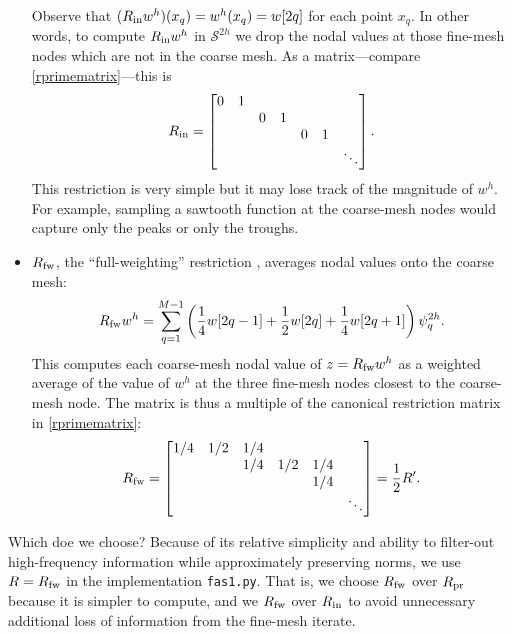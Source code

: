 \documentclass[letterpaper,final,12pt,reqno]{amsart}
\begin{document}
\begin{itemize}
Observe that $(R_{\text{in}} w^h)(x_q) = w^h(x_q) = w[2q]$ for each point $x_q$.  In other words, to compute $R_{\text{in}} w^h$ in $\mathcal{S}^{2h}$ we drop the nodal values at those fine-mesh nodes which are not in the coarse mesh.  As a matrix---compare \eqref{rprimematrix}---this is
\begin{equation}
R_{\text{in}} = \begin{bmatrix}
0 & 1 &   &   &   &   &\\
  &   & 0 & 1 &   &   & \\
  &   &   &   & 0 & 1 & \\
  &   &   &   &   &   & \ddots
\end{bmatrix}. \label{rinmatrix}
\end{equation}
This restriction is very simple but it may lose track of the magnitude of $w^h$.  For example, sampling a sawtooth function at the coarse-mesh nodes would capture only the peaks or only the troughs.
\item $R_{\text{fw}}$, the ``full-weighting'' restriction \cite{Briggsetal2000}, averages nodal values onto the coarse mesh:
\begin{equation}
  R_{\text{fw}} w^h = \sum_{q=1}^{M-1} \left(\frac{1}{4} w[2q-1] + \frac{1}{2} w[2q] + \frac{1}{4} w[2q+1]\right) \psi_q^{2h}. \label{rfwdefinition}
\end{equation}
This computes each coarse-mesh nodal value of $z=R_{\text{fw}} w^h$ as a weighted average of the value of $w^h$ at the three fine-mesh nodes closest to the coarse-mesh node.  The matrix is thus a multiple of the canonical restriction matrix in \eqref{rprimematrix}:
\begin{equation}
R_{\text{fw}} = \begin{bmatrix}
1/4 & 1/2 & 1/4 &     &     &  \\
    &     & 1/4 & 1/2 & 1/4 &  \\
    &     &     &     & 1/4 &  \\
    &     &     &     &     & \ddots
\end{bmatrix} = \frac{1}{2} R'. \label{rfwmatrix}
\end{equation}
\end{itemize}

\medskip
Which doe we choose?  Because of its relative simplicity and ability to filter-out high-frequency information while approximately preserving norms, we use $R=R_{\text{fw}}$ in the implementation \texttt{fas1.py}.  That is, we choose $R_{\text{fw}}$ over $R_{\text{pr}}$ because it is simpler to compute, and we $R_{\text{fw}}$ over $R_{\text{in}}$ to avoid unnecessary additional loss of information from the fine-mesh iterate.
\end{document}
